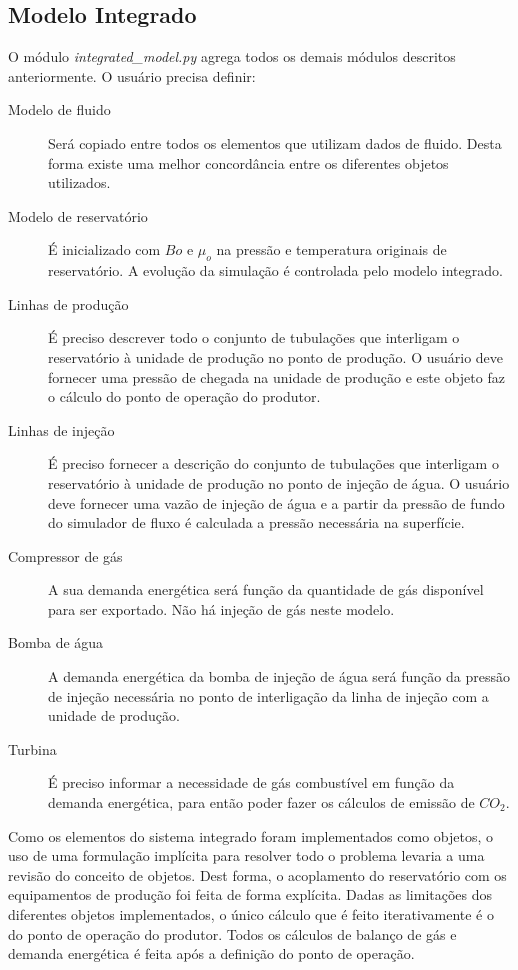 \documentclass[final,5p]{elsarticle}
\numberwithin{equation}{section}
\begin{document}
    \subsection{Modelo Integrado}

        O módulo \emph{integrated\_model.py} agrega todos os demais módulos descritos anteriormente. O usuário precisa definir:

        \begin{description}
            \item[Modelo de fluido] Será copiado entre todos os elementos que utilizam dados de fluido. Desta forma existe uma melhor concordância entre os diferentes objetos utilizados.
            \item[Modelo de reservatório] É inicializado com $Bo$ e $\mu_o$ na pressão e temperatura originais de reservatório. A evolução da simulação é controlada pelo modelo integrado.
            \item[Linhas de produção] É preciso descrever todo o conjunto de tubulações que interligam o reservatório à unidade de produção no ponto de produção. O usuário deve fornecer uma pressão de chegada na unidade de produção e este objeto faz o cálculo do ponto de operação do produtor.
            \item[Linhas de injeção] É preciso fornecer a descrição do conjunto de tubulações que interligam o reservatório à unidade de produção no ponto de injeção de água. O usuário deve fornecer uma vazão de injeção de água e a partir da pressão de fundo do simulador de fluxo é calculada a pressão necessária na superfície.
            \item[Compressor de gás] A sua demanda energética será função da quantidade de gás disponível para ser exportado. Não há injeção de gás neste modelo.
            \item[Bomba de água] A demanda energética da bomba de injeção de água será função da pressão de injeção necessária no ponto de interligação da linha de injeção com a unidade de produção.
            \item[Turbina] É preciso informar a necessidade de gás combustível em função da demanda energética, para então poder fazer os cálculos de emissão de $CO_2$.
        \end{description}

        Como os elementos do sistema integrado foram implementados como objetos, o uso de uma formulação implícita para resolver todo o problema levaria a uma revisão do conceito de objetos. Dest forma, o acoplamento do reservatório com os equipamentos de produção foi feita de forma explícita. Dadas as limitações dos diferentes objetos implementados, o único cálculo que é feito iterativamente é o do ponto de operação do produtor. Todos os cálculos de balanço de gás e demanda energética é feita após a definição do ponto de operação.
\end{document}
